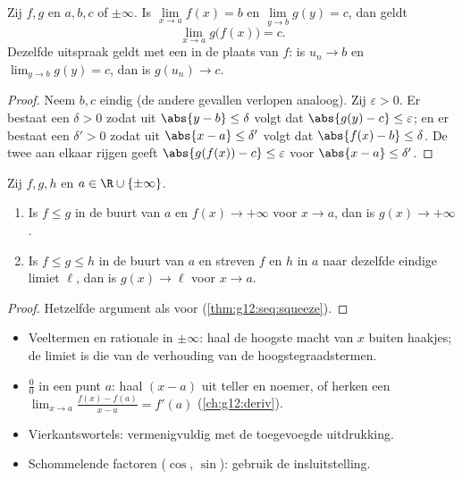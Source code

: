 \begin{theorem}\label{thm:g12:limcont:composition}
Zij $f, g$  en $a, b, c$  of $\pm\infty$. Is
$\lim\limits_{x \to a} f(x) = b$ en $\lim\limits_{y \to b} g(y) = c$, dan
geldt
\[
\lim_{x \to a} g\bigl(f(x)\bigr) = c .
\]
Dezelfde uitspraak geldt met een  in de plaats van $f$: is $u_n \to b$ en
$\lim_{y\to b} g(y) = c$, dan is $g(u_n) \to c$.
\end{theorem}

\begin{proof}
Neem $b, c$ eindig (de andere gevallen verlopen analoog). Zij
$\varepsilon > 0$. Er bestaat een $\delta > 0$ zodat uit
$\abs{y - b} \leq \delta$ volgt dat $\abs{g(y) - c} \leq \varepsilon$; en er
bestaat een $\delta' > 0$ zodat uit $\abs{x - a} \leq \delta'$ volgt dat
$\abs{f(x) - b} \leq \delta$. De twee aan elkaar rijgen geeft
$\abs{g(f(x)) - c} \leq \varepsilon$ voor $\abs{x - a} \leq \delta'$.
\end{proof}

\begin{theorem}\label{thm:g12:limcont:squeeze}
Zij $f, g, h$  en $a \in \R \cup \{\pm\infty\}$.
\begin{enumerate}
  \item Is $f \leq g$ in de buurt van $a$ en $f(x) \to +\infty$ voor
        $x \to a$, dan is $g(x) \to +\infty$.
  \item Is $f \leq g \leq h$ in de buurt van $a$ en streven $f$ en $h$ in $a$
        naar dezelfde eindige limiet $\ell$, dan is $g(x) \to \ell$ voor
        $x \to a$.
\end{enumerate}
\end{theorem}

\begin{proof}
Hetzelfde argument als voor  (\cref{thm:g12:seq:squeeze}).
\end{proof}

\begin{method}\label{met:g12:limcont:limits}
\begin{itemize}
  \item Veeltermen en rationale  in $\pm\infty$: haal de hoogste
        macht van $x$ buiten haakjes; de limiet is die van de verhouding van
        de hoogstegraadstermen.
  \item $\frac{0}{0}$ in een punt $a$: haal $(x-a)$ uit teller en noemer, of
        herken een  $\lim_{x\to a}\frac{f(x)-f(a)}{x-a} = f'(a)$
        (\cref{ch:g12:deriv}).
  \item Vierkantswortels: vermenigvuldig met de toegevoegde uitdrukking.
  \item Schommelende factoren ($\cos$, $\sin$): gebruik de insluitstelling.
\end{itemize}
\end{method}

